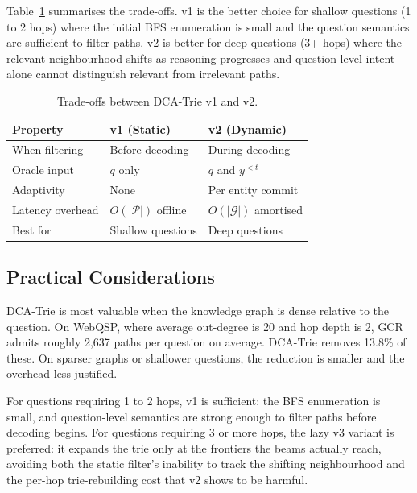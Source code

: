 Table~\ref{tab:v1v2} summarises the trade-offs. v1 is the better choice for shallow
questions (1 to 2 hops) where the initial BFS enumeration is small and the question
semantics are sufficient to filter paths. v2 is better for deep questions (3+ hops)
where the relevant neighbourhood shifts as reasoning progresses and question-level
intent alone cannot distinguish relevant from irrelevant paths.

\begin{table}[htpb]
  \centering
  \caption{Trade-offs between DCA-Trie v1 and v2.}
  \label{tab:v1v2}
  \begin{tabular}{@{}lll@{}}
    \toprule
    Property         & v1 (Static)           & v2 (Dynamic) \\
    \midrule
    When filtering   & Before decoding       & During decoding \\
    Oracle input     & $q$ only              & $q$ and $y^{<t}$ \\
    Adaptivity       & None                  & Per entity commit \\
    Latency overhead & $O(|\mathcal{P}|)$ offline & $O(|\mathcal{G}|)$ amortised \\
    Best for         & Shallow questions     & Deep questions \\
    \bottomrule
  \end{tabular}
\end{table}

\subsection{Practical Considerations}
\label{sec:method:practical}

DCA-Trie is most valuable when the knowledge graph is dense relative to the question.
On WebQSP, where average out-degree is 20 and hop depth is 2, GCR admits roughly 2,637
paths per question on average. DCA-Trie removes 13.8\% of these. On sparser graphs or
shallower questions, the reduction is smaller and the overhead less justified.

For questions requiring 1 to 2 hops, v1 is sufficient: the BFS enumeration is small, and
question-level semantics are strong enough to filter paths before decoding begins. For
questions requiring 3 or more hops, the lazy v3 variant is preferred: it expands the
trie only at the frontiers the beams actually reach, avoiding both the static filter's
inability to track the shifting neighbourhood and the per-hop trie-rebuilding cost that
v2 shows to be harmful.

